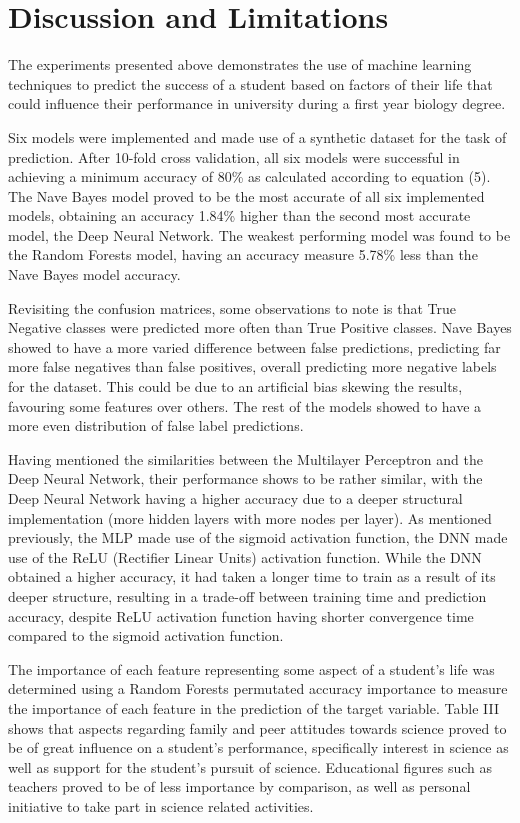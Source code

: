 \documentclass[conference]{IEEEtran}
\begin{document}
\section{Discussion and Limitations}
The experiments presented above demonstrates the use of machine learning techniques to predict the success of a student based on factors of their life that could influence their performance in university during a first year biology degree.

Six models were implemented and made use of a synthetic dataset for the task of prediction. After 10-fold cross validation, all six models were successful in achieving a minimum accuracy of 80\% as calculated according to equation (5). The Nave Bayes model proved to be the most accurate of all six implemented models, obtaining an accuracy 1.84\% higher than the second most accurate model, the Deep Neural Network. The weakest performing model was found to be the Random Forests model, having an accuracy measure 5.78\% less than the Nave Bayes model accuracy.

Revisiting the confusion matrices, some observations to note is that True Negative classes were predicted more often than True Positive classes. Nave Bayes showed to have a more varied difference between false predictions, predicting far more false negatives than false positives, overall predicting more negative labels for the dataset. This could be due to an artificial bias skewing the results, favouring some features over others. The rest of the models showed to have a more even distribution of false label predictions.

Having mentioned the similarities between the Multilayer Perceptron and the Deep Neural Network, their performance shows to be rather similar, with the Deep Neural Network having a higher accuracy due to a deeper structural implementation (more hidden layers with more nodes per layer). As mentioned previously, the MLP made use of the sigmoid activation function, the DNN made use of the ReLU (Rectifier Linear Units) activation function. While the DNN obtained a higher accuracy, it had taken a longer time to train as a result of its deeper structure, resulting in a trade-off between training time and prediction accuracy, despite ReLU activation function having shorter convergence time compared to the sigmoid activation function.

The importance of each feature representing some aspect of a student's life was determined using a Random Forests permutated accuracy importance to measure the importance of each feature in the prediction of the target variable. Table III shows that aspects regarding family and peer attitudes towards science proved to be of great influence on a student's performance, specifically interest in science as well as support for the student's pursuit of science. Educational figures such as teachers proved to be of less importance by comparison, as well as personal initiative to take part in science related activities.
\end{document}

